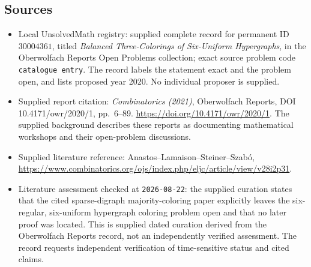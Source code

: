 \documentclass[11pt]{article}
\begin{document}
\subsection{Sources}
\begin{itemize}
\item Local UnsolvedMath registry: supplied complete record for permanent ID \(30004361\), titled \emph{Balanced Three-Colorings of Six-Uniform Hypergraphs}, in the Oberwolfach Reports Open Problems collection; exact source problem code \texttt{catalogue entry}. The record labels the statement exact and the problem open, and lists proposed year 2020. No individual proposer is supplied.
\item Supplied report citation: \emph{Combinatorics (2021)}, Oberwolfach Reports, DOI 10.4171/owr/2020/1, pp.\ 6--89. \url{https://doi.org/10.4171/owr/2020/1}. The supplied background describes these reports as documenting mathematical workshops and their open-problem discussions.
\item Supplied literature reference: Anastos--Lamaison--Steiner--Szab\'o, \url{https://www.combinatorics.org/ojs/index.php/eljc/article/view/v28i2p31}.
\item Literature assessment checked at \texttt{2026-08-22}: the supplied curation states that the cited sparse-digraph majority-coloring paper explicitly leaves the six-regular, six-uniform hypergraph coloring problem open and that no later proof was located. This is supplied dated curation derived from the Oberwolfach Reports record, not an independently verified assessment. The record requests independent verification of time-sensitive status and cited claims.
\end{itemize}
\end{document}
